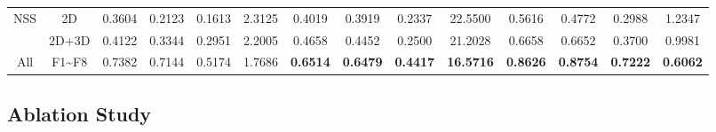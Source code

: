 \documentclass[lettersize,journal]{IEEEtran}
\begin{document}
\begin{table*}[t]
\begin{center}
\begin{tabular}{c|c|cccc|cccc|cccc}
\multirow{2}{*}{NSS} & 2D & 0.3604 & 0.2123 & 0.1613 &2.3125 & 0.4019 &0.3919 & 0.2337 & 22.5500 & 0.5616 &0.4772 & 0.2988 &1.2347\\
    &2D+3D &0.4122 & 0.3344 & 0.2951 &2.2005 & 0.4658 & 0.4452 & 0.2500 & 21.2028 & 0.6658 & 0.6652 & 0.3700 & 0.9981\\\hline
All & F1\~{}F8 & 0.7382 & 0.7144 & 0.5174 & 1.7686 & \textbf{0.6514} & \textbf{0.6479} & \textbf{0.4417} & \textbf{16.5716} & \textbf{0.8626} & \textbf{0.8754} & \textbf{0.7222} & \textbf{0.6062}\\
    \bottomrule
  \end{tabular}
  \end{center}
  \vspace{-5pt}
\end{table*}



\subsection{Ablation Study}
\end{document}
